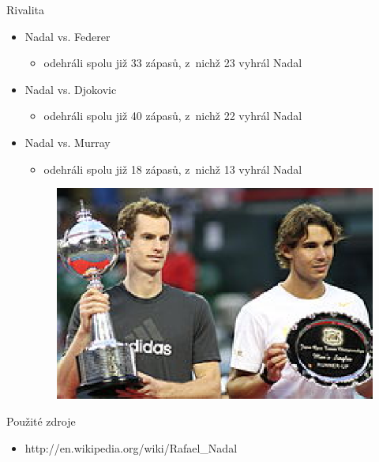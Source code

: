 \documentclass[pdf,slideColor,azure]{prosper}
\begin{document}
\begin{slide}{Rivalita}
\begin{itemize}
\item Nadal vs. Federer
\begin{itemize}
\item odehráli spolu již 33 zápasů, z~nichž 23 vyhrál Nadal
\end{itemize}
\item Nadal vs. Djokovic
\begin{itemize}
\item odehráli spolu již 40 zápasů, z~nichž 22 vyhrál Nadal
\end{itemize}
\item Nadal vs. Murray
\begin{itemize}
\item odehráli spolu již 18 zápasů, z~nichž 13 vyhrál Nadal
\end{itemize}
\begin{figure}
\centering
\includegraphics[scale=0.45]{obr3.eps}
\end{figure}
\end{itemize}
\end{slide}

\begin{slide}{Použité zdroje}
\begin{itemize}
\item http://en.wikipedia.org/wiki/Rafael\_Nadal
\end{itemize}
\end{slide}
\end{document}
